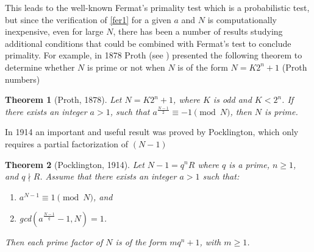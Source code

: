 \documentclass{amsart}
\newtheorem{theorem}{Theorem}[section]
\numberwithin{equation}{section}
\begin{document}
This leads to the well-known Fermat's primality test which is a probabilistic test, 
but since the verification of \eqref{fer1} for a given $a$ and $N$ is computationally inexpensive, even for large $N$, there has been a number of results studying additional conditions that could be combined with Fermat's test to conclude primality. For example, in 1878 Proth (see \cite{Rib}) presented the following theorem to determine whether $N$ is prime or not when $N$ is of the form $N=K2^n+1$ (Proth numbers)

\begin{theorem} [Proth, 1878]
	Let $N=K2^n+1$, where $K$ is odd and $K<2^n$. If there exists an integer $a>1$, such that $a^{\frac{N-1}{2}} \equiv -1 \pmod {N}$, then $N$ is prime.
\end{theorem}

In 1914 an important and useful result was proved by Pocklington, which only requires a partial factorization of $(N-1)$ 

\begin{theorem}[Pocklington, 1914]\label{Pock1}
	Let $N-1=q^nR$ where $q$ is a prime, $n \ge 1$, and $q \nmid R$. Assume that there exists an integer $a>1$ such that:
	\begin{enumerate}
		\item[(i)] $ a^{N-1} \equiv 1 \pmod N$, and
		\item[(ii)] gcd$(a^{\frac{N-1}{q}}-1, N)=1$.
	\end{enumerate}
	Then each prime factor of $N$ is of the form $mq^n+1$, with $m \ge 1$.
\end{theorem}
\end{document}
